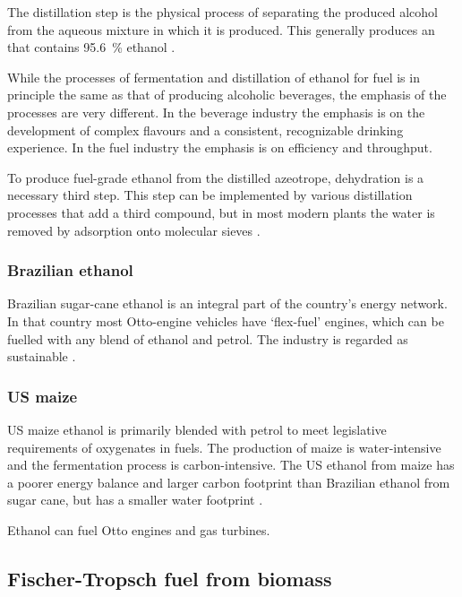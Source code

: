 The distillation step is the physical process of separating the produced alcohol
from the aqueous mixture in which it is produced. This generally produces an
 that contains \SI{95.6}{\percent} ethanol
\autocite{Kumar2010}.

While the processes of fermentation and distillation of ethanol for fuel is in
principle the same as that of producing alcoholic beverages, the emphasis of the
processes are very different. In the beverage industry the emphasis is on the
development of complex flavours and a consistent, recognizable drinking 
experience. In the fuel industry the emphasis is on efficiency and throughput.

To produce fuel-grade ethanol from the distilled azeotrope, dehydration is a
necessary third step. This step can be implemented by various distillation
processes that add a third compound, but in most modern plants the water is
removed by adsorption onto molecular sieves \autocite{Kumar2010}.

\subsubsection{Brazilian ethanol}

Brazilian sugar-cane ethanol is an integral part of the country's energy
network. In that country most Otto-engine vehicles have `flex-fuel' engines,
which can be fuelled with any blend of ethanol and petrol. The industry is
regarded as sustainable \autocite{Smeets2006}.

\subsubsection{US maize}

US maize ethanol is primarily blended with petrol to meet legislative
requirements of oxygenates in fuels. The production of maize is water-intensive
and the fermentation process is carbon-intensive. The US ethanol from maize has
a poorer energy balance and larger carbon footprint than Brazilian ethanol from
sugar cane, but has a smaller water footprint \autocite{Mekonnen2018}.

Ethanol can fuel Otto engines and gas turbines. 

\subsection{Fischer-Tropsch fuel from biomass}
\label{sec:FT}

